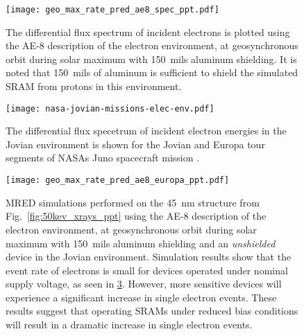 \begin{figure}[htbp]
    \begin{center}
        \texttt{[image: geo\_max\_rate\_pred\_ae8\_spec\_ppt.pdf]}
    \end{center}
    \caption{The differential flux spectrum of incident electrons is plotted using the AE-8 description of the electron environment, at geosynchronous orbit during solar maximum with 150~mils aluminum shielding. It is noted that 150~mils of aluminum is sufficient to shield the simulated SRAM from protons in this environment.}
    \label{fig:ae8_spec_ppt}
\end{figure}

\begin{figure}[htbp]
    \begin{center}
        \texttt{[image: nasa-jovian-missions-elec-env.pdf]}
    \end{center}
    \caption[The differential flux specetrum of incident electron energies in the Jovian environment is shown for the Jovian and Europa tour segments of NASAs Juno spacecraft mission.]{The differential flux specetrum of incident electron energies in the Jovian environment is shown for the Jovian and Europa tour segments of NASAs Juno spacecraft mission \cite{garrett2012galileo}.}
    \label{fig:nasa-jovian-missions-elec-env}
\end{figure}

\begin{figure}[htbp]
    \begin{center}
        \texttt{[image: geo\_max\_rate\_pred\_ae8\_europa\_ppt.pdf]}
    \end{center}
    \caption{MRED simulations performed on the 45~nm structure from Fig.~\ref{fig:50kev_xrays_ppt} using the AE-8 description of the electron environment, at geosynchronous orbit during solar maximum with 150~mils aluminum shielding and an \emph{unshielded} device in the Jovian environment. Simulation results show that the event rate of electrons is small for devices operated under nominal supply voltage, as seen in \ref{fig:geo_max_rate_pred_ae8_ppt}. However, more sensitive devices will experience a significant increase in single electron events. These results suggest that operating SRAMs under reduced bias conditions will result in a dramatic increase in single electron events.}
    \label{fig:geo_max_rate_pred_ae8_ppt}
\end{figure}

